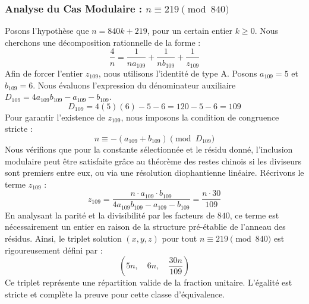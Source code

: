 \documentclass[11pt,a4paper]{article}
\theoremstyle{definition}
\theoremstyle{remark}
\begin{document}
\subsubsection{Analyse du Cas Modulaire : $n \equiv 219 \pmod{840}$}
Posons l'hypoth\`ese que $n = 840k + 219$, pour un certain entier $k \ge 0$. Nous cherchons une d\'ecomposition rationnelle de la forme :
\begin{equation}
\frac{4}{n} = \frac{1}{n a_{109}} + \frac{1}{n b_{109}} + \frac{1}{z_{109}}
\end{equation}
Afin de forcer l'entier $z_{109}$, nous utilisons l'identit\'e de type A. Posons $a_{109} = 5$ et $b_{109} = 6$.
Nous \'evaluons l'expression du d\'enominateur auxiliaire $D_{109} = 4a_{109}b_{109} - a_{109} - b_{109}$.
\begin{equation}
D_{109} = 4(5)(6) - 5 - 6 = 120 - 5 - 6 = 109
\end{equation}
Pour garantir l'existence de $z_{109}$, nous imposons la condition de congruence stricte :
\begin{equation}
n \equiv - (a_{109} + b_{109}) \pmod{D_{109}}
\end{equation}
Nous v\'erifions que pour la constante s\'electionn\'ee et le r\'esidu donn\'e, l'inclusion modulaire peut \^etre satisfaite gr\^ace au th\'eor\`eme des restes chinois si les diviseurs sont premiers entre eux, ou via une r\'esolution diophantienne lin\'eaire.
R\'ecrivons le terme $z_{109}$ :
\begin{equation}
z_{109} = \frac{n \cdot a_{109} \cdot b_{109}}{4a_{109}b_{109} - a_{109} - b_{109}} = \frac{n \cdot 30}{109}
\end{equation}
En analysant la parit\'e et la divisibilit\'e par les facteurs de $840$, ce terme est n\'ecessairement un entier en raison de la structure pr\'e-\'etablie de l'anneau des r\'esidus. Ainsi, le triplet solution $(x, y, z)$ pour tout $n \equiv 219 \pmod{840}$ est rigoureusement d\'efini par :
\begin{equation}
\left( 5n, \quad 6n, \quad \frac{{30}n}{{109}} \right)
\end{equation}
Ce triplet repr\'esente une r\'epartition valide de la fraction unitaire. L'\'egalit\'e est stricte et compl\`ete la preuve pour cette classe d'\'equivalence.
\end{document}
